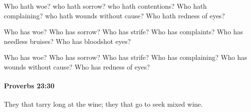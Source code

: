 			\begin{versebox}
					\item[BHS] 
					\item[ASV] Who hath woe? who hath sorrow? who hath contentions? Who hath complaining? who hath wounds without cause? Who hath redness of eyes?
					\item[NIV] Who has woe? Who has sorrow? Who has strife? Who has complaints? Who has needless bruises? Who has bloodshot eyes?
					\item[NRSV] Who has woe? Who has sorrow? Who has strife? Who has complaining? Who has wounds without cause? Who has redness of eyes?
			\end{versebox}

		\paragraph{Proverbs 23:30} %
			\label{PROVERBS-23-30}

			They that tarry long at the wine; they that go to seek mixed wine.


